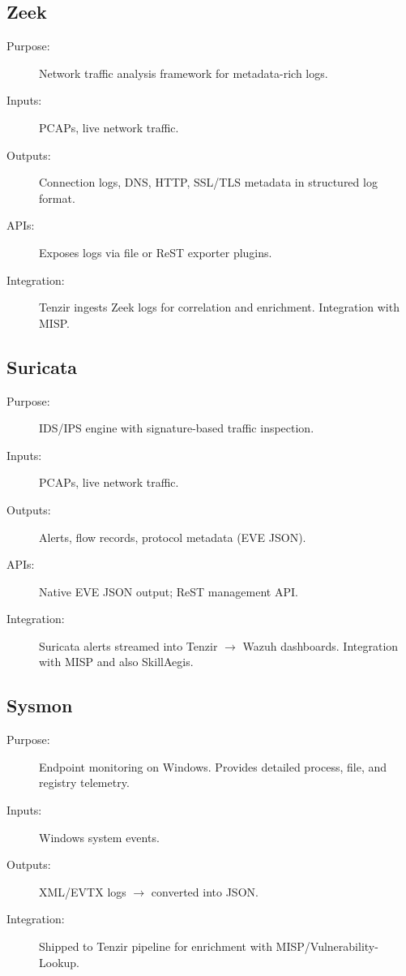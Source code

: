 \documentclass[10pt,a4paper]{report}
\begin{document}
\subsection{Zeek}
\begin{description}
  \item[Purpose:] Network traffic analysis framework for metadata-rich logs.
  \item[Inputs:] PCAPs, live network traffic.
  \item[Outputs:] Connection logs, DNS, HTTP, SSL/TLS metadata in structured
  log format.
  \item[APIs:] Exposes logs via file or ReST exporter plugins.
  \item[Integration:] Tenzir ingests Zeek logs for correlation and enrichment.
  Integration with MISP.
\end{description}


\subsection{Suricata}
\begin{description}
  \item[Purpose:] IDS/IPS engine with signature-based traffic inspection.
  \item[Inputs:] PCAPs, live network traffic.
  \item[Outputs:] Alerts, flow records, protocol metadata (EVE JSON).
  \item[APIs:] Native EVE JSON output; ReST management API.
  \item[Integration:] Suricata alerts streamed into Tenzir $\rightarrow$
  Wazuh dashboards. Integration with MISP and also SkillAegis.
\end{description}

\subsection{Sysmon}
\begin{description}
  \item[Purpose:] Endpoint monitoring on Windows. Provides detailed process,
  file, and registry telemetry.
  \item[Inputs:] Windows system events.
  \item[Outputs:] XML/EVTX logs $\rightarrow$ converted into JSON.
  \item[Integration:] Shipped to Tenzir pipeline for enrichment with
  MISP/Vulnerability-Lookup.
\end{description}
\end{document}
